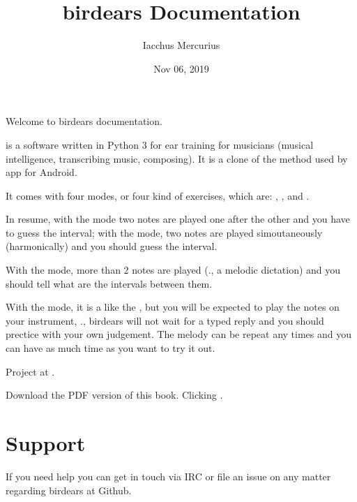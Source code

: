 \documentclass[letterpaper,10pt,english]{sphinxmanual}
\title{birdears Documentation}
\date{Nov 06, 2019}
\author{Iacchus Mercurius}
\begin{document}
\pagestyle{empty}
\sphinxmaketitle
\pagestyle{plain}
\sphinxtableofcontents
\pagestyle{normal}
\label{\detokenize{index::doc}}


Welcome to birdears documentation.

 is a software written in Python 3 for ear training for
musicians (musical intelligence, transcribing music, composing). It is a
clone of the method used by 
app for Android.

It comes with four modes, or four kind of exercises, which are:
, ,  and .

In resume, with the  mode two notes are played one after the
other and you have to guess the interval; with the  mode,
two notes are played simoutaneously (harmonically) and you should guess
the interval.

With the  mode, more than 2 notes are played (., a
melodic dictation) and you should tell what are the intervals between
them.

With the  mode, it is a like the , but you will
be expected to play the notes on your instrument, ., birdears will
not wait for a typed reply and you should prectice with your own
judgement. The melody can be repeat any times and you can have as much
time as you want to try it out.

Project at .

Download the PDF version of this book. Clicking .




\chapter{Support}
\label{\detokenize{community:support}}\label{\detokenize{community::doc}}
If you need help you can get in touch via IRC or file an issue on any matter regarding birdears at Github.
\end{document}
